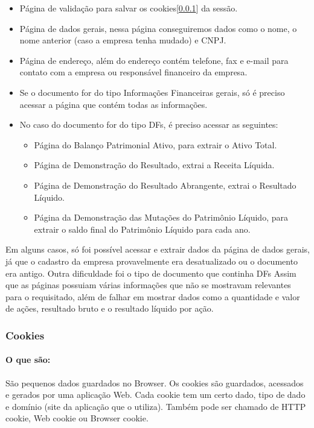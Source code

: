 \documentclass[a4paper, 12pt]{article}
\begin{document}
\begin{itemize}
\item Página de validação para salvar os cookies[\ref{cookies}] da sessão.
\item Página de dados gerais, nessa página conseguiremos dados como o
  nome, o nome anterior (caso a empresa tenha mudado) e CNPJ.
\item Página de endereço, além do endereço contém telefone, fax e
  e-mail para contato com a empresa ou responsável financeiro da empresa.
\item Se o documento for do tipo Informações Financeiras gerais, só é
  preciso acessar a página que contém todas as informações.
\item No caso do documento for do tipo DFs, é preciso acessar as seguintes:
\begin{itemize}
\item Página do Balanço Patrimonial Ativo, para extrair o Ativo Total.
\item Página de Demonstração do Resultado, extrai a Receita Líquida.
\item Página de Demonstração do Resultado Abrangente, extrai o
  Resultado Líquido.
\item Página da Demonstração das Mutações do Patrimônio Líquido, para
  extrair o saldo final do Patrimônio Líquido para cada ano.
\end{itemize}
\end{itemize}

Em alguns casos, só foi possível acessar e extrair dados
da página de dados gerais, já que o cadastro da empresa provavelmente
era desatualizado ou o documento era antigo. Outra dificuldade foi o
tipo de documento que continha DFs Assim que as páginas possuiam
várias informações que não se mostravam relevantes para o requisitado,
além de falhar em mostrar dados como a quantidade e valor de ações,
resultado bruto e o resultado líquido por ação.

\subsubsection{Cookies}\label{cookies}

\paragraph{O que são:}São pequenos dados guardados no Browser. Os
cookies são guardados, acessados e gerados por uma aplicação Web. Cada
cookie tem um certo dado, tipo de dado e domínio (site da aplicação
que o utiliza). Também pode ser chamado de HTTP cookie, Web cookie ou
Browser cookie.
\end{document}
